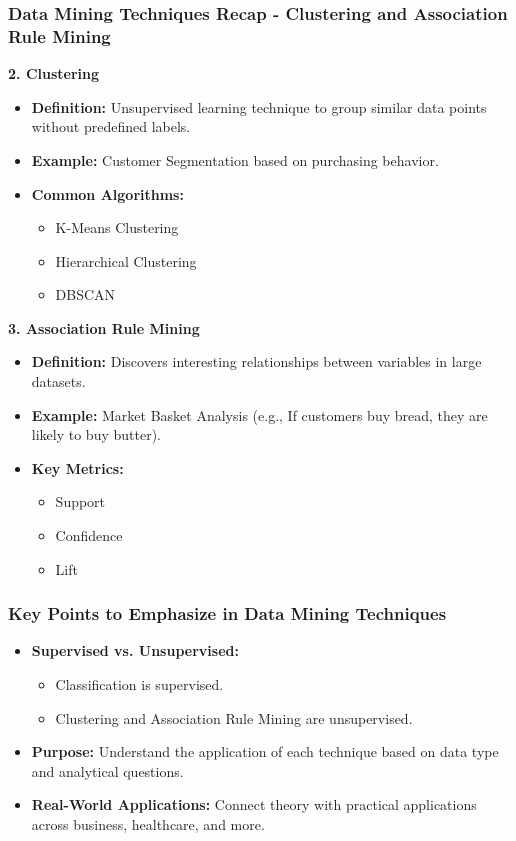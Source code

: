 \documentclass[aspectratio=169]{beamer}
\begin{document}
\begin{frame}[fragile]
    \frametitle{Data Mining Techniques Recap - Clustering and Association Rule Mining}

    \textbf{2. Clustering}
    \begin{itemize}
        \item \textbf{Definition:} Unsupervised learning technique to group similar data points without predefined labels.
        \item \textbf{Example:} Customer Segmentation based on purchasing behavior.
        \item \textbf{Common Algorithms:}
        \begin{itemize}
            \item K-Means Clustering
            \item Hierarchical Clustering
            \item DBSCAN
        \end{itemize}
    \end{itemize}
    
    \textbf{3. Association Rule Mining}
    \begin{itemize}
        \item \textbf{Definition:} Discovers interesting relationships between variables in large datasets.
        \item \textbf{Example:} Market Basket Analysis (e.g., If customers buy bread, they are likely to buy butter).
        \item \textbf{Key Metrics:}
        \begin{itemize}
            \item Support
            \item Confidence
            \item Lift
        \end{itemize}
    \end{itemize}
\end{frame}

\begin{frame}[fragile]
    \frametitle{Key Points to Emphasize in Data Mining Techniques}
    
    \begin{itemize}
        \item \textbf{Supervised vs. Unsupervised:} 
        \begin{itemize}
            \item Classification is supervised.
            \item Clustering and Association Rule Mining are unsupervised.
        \end{itemize}
        
        \item \textbf{Purpose:} Understand the application of each technique based on data type and analytical questions.
        
        \item \textbf{Real-World Applications:} Connect theory with practical applications across business, healthcare, and more.
    \end{itemize}
\end{frame}
\end{document}
